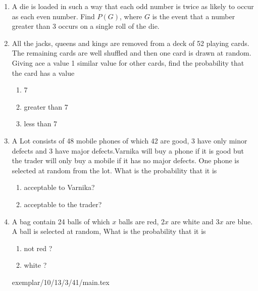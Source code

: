 \begin{enumerate}[label=\thesection.\arabic*,ref=\thesection.\theenumi]
	\item  A die is loaded in such a way that each odd number is twice as likely to occur as
each even number. Find $P(G)$, where $G$ is the event that a number greater than
3 occurs on a single roll of the die.
\\
\solution
		
	\item All the jacks, queens and kings are removed from a deck of 52 playing cards. The remaining cards are well shuffled and then one card is drawn at random. Giving ace a value 1 similar value for other cards, find the probability that the card has a value 
		\begin{enumerate}
			\item 7
			\item greater than 7
			\item less than 7
		\end{enumerate}
		
  \item A Lot consists of 48 mobile phones of which 42 are good, 3 have only minor defects and 3 have major defects.Varnika will buy a phone if it is good but the trader will only buy a mobile if it has no major defects. One phone is selected at random from the lot. What is the probability that it is
\begin{enumerate}
	\item acceptable to Varnika?
            \item acceptable to the trader?
\end{enumerate}
\solution
	
 \item A bag contain 24 balls of which $x$ balls are red, $2x$ are white and $3x$ are blue. A ball is selected at random, What is the probability that it is
\begin{enumerate}[label=\alph*)]
\item not red ?
\item white ?
\end{enumerate}
 {exemplar/10/13/3/41/main.tex}
\end{enumerate}
